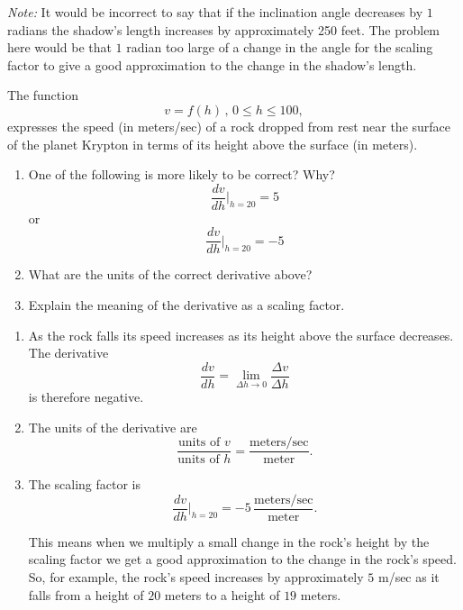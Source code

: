 \documentclass{ximera}
\begin{document}
\begin{example}
\begin{explanation}
\begin{enumerate}
\emph{Note:} It would be incorrect to say that if the inclination angle decreases by $1$ radians the shadow's length increases by approximately 250 feet. The problem here would be that $1$ radian too large of a change in the angle for the scaling factor to give a good approximation to the change in the shadow's length. 

\end{enumerate}
\end{explanation}


\begin{example} \label{ExKver3}
The function
\[
    v = f(h) \, , \, 0\leq h \leq 100,
\]
expresses the speed (in meters/sec) of a rock dropped from rest near the surface of the planet Krypton in terms of its height above the surface (in meters).

\begin{enumerate}
\item One of the following is more likely to be correct? Why?
\[
    \frac{dv}{dh}\Big|_{h=20} = 5
\]
or 
\[
  \frac{dv}{dh}\Big|_{h=20} = -5
\]

\item What are the units of the correct derivative above?

\item Explain the meaning of the derivative as a scaling factor.
\end{enumerate}

\begin{explanation}
\begin{enumerate}
\item As the rock falls its speed increases as its height above the surface decreases. The derivative
\[
    \frac{dv}{dh} = \lim_{\Delta h \to 0} \frac{\Delta v}{\Delta h}
\]
is therefore negative.

\item The units of the derivative are 
\[
     \frac{\text{units of } v }{\text{units of }h} =  \frac{\text{meters/sec}}{\text{meter}} .
\]

\item The scaling factor is
\[
  \frac{dv}{dh}\Big|_{h=20} = -5 \, \frac{\text{meters/sec}}{\text{meter}}.
\]

This means when we multiply a small change in the rock's height by the scaling factor we get a good approximation to the change in the rock's speed. So, for example, the rock's speed increases by approximately $5$ m/sec as it falls from a height of $20$ meters to a height of $19$ meters.


\end{enumerate}
\end{explanation}
\end{example}
\end{example}
\end{document}
